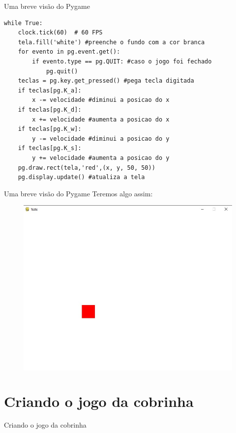 \documentclass[fleqn,utf8,aspectratio=169,14pt]{beamer}
\begin{document}
	\begin{frame}[fragile]{Uma breve visão do Pygame}
		\begin{lstlisting}
while True:
	clock.tick(60)  # 60 FPS
	tela.fill('white') #preenche o fundo com a cor branca
	for evento in pg.event.get():
		if evento.type == pg.QUIT: #caso o jogo foi fechado
			pg.quit()
	teclas = pg.key.get_pressed() #pega tecla digitada
	if teclas[pg.K_a]:
		x -= velocidade #diminui a posicao do x
	if teclas[pg.K_d]:
		x += velocidade #aumenta a posicao do x
	if teclas[pg.K_w]:
		y -= velocidade #diminui a posicao do y
	if teclas[pg.K_s]:
		y += velocidade #aumenta a posicao do y
	pg.draw.rect(tela,'red',(x, y, 50, 50))
	pg.display.update() #atualiza a tela	
		\end{lstlisting}
	\end{frame}
	
	\begin{frame}{Uma breve visão do Pygame}
		Teremos algo assim:
		
		\begin{figure}
			\centering
			\includegraphics[width=0.7\linewidth]{Imagem8}
			\caption{}
			\label{fig:imagem8}
		\end{figure}
		
	\end{frame}
	
	\section{Criando o jogo da cobrinha}
	\begin{frame}{Criando o jogo da cobrinha}
		
		
	\end{frame}
	
\end{document}
